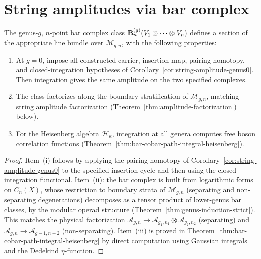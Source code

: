 \section{String amplitudes via bar complex}

\begin{theorem}
\label{thm:bar-string-integrand}
The genus-$g$, $n$-point bar complex class
$\bar{\mathbf{B}}^{(g)}_n(V_1 \otimes \cdots \otimes V_n)$
defines a section of the appropriate line bundle over
$\overline{\mathcal{M}}_{g,n}$, with the following
properties:
\begin{enumerate}[label=\textup{(\roman*)}]
\item At $g=0$, impose all constructed-carrier, insertion-map, pairing-homotopy, and closed-integration hypotheses of Corollary~\ref{cor:string-amplitude-genus0}.
  Then integration gives the same amplitude on the two specified complexes.
\item The class factorizes along the boundary
  stratification of $\overline{\mathcal{M}}_{g,n}$,
  matching string amplitude factorization
  \textup{(}Theorem~\textup{\ref{thm:amplitude-factorization})}
  below\textup{)}.
\item For the Heisenberg algebra $\mathcal{H}_\kappa$,
  integration at all genera computes free boson
  correlation functions
  \textup{(}Theorem~\textup{\ref{thm:bar-cobar-path-integral-heisenberg})}.
\end{enumerate}
\end{theorem}

\begin{proof}
Item~(i) follows by applying the pairing homotopy of Corollary~\ref{cor:string-amplitude-genus0} to the specified insertion cycle and then using the closed integration functional.
Item~(ii): the bar complex is built from logarithmic
forms on $\overline{C}_n(X)$, whose restriction to
boundary strata of $\overline{\mathcal{M}}_{g,n}$
(separating and non-separating degenerations) decomposes
as a tensor product of lower-genus bar classes, by the
modular operad structure
(Theorem~\ref{thm:genus-induction-strict}).  This
matches the physical factorization
$\mathcal{A}_{g,n} \to \mathcal{A}_{g_1,n_1} \otimes
\mathcal{A}_{g_2,n_2}$ (separating) and
$\mathcal{A}_{g,n} \to \mathcal{A}_{g-1,n+2}$
(non-separating).
Item~(iii) is proved in
Theorem~\ref{thm:bar-cobar-path-integral-heisenberg} by
direct computation using Gaussian integrals and the
Dedekind $\eta$-function.
\end{proof}


